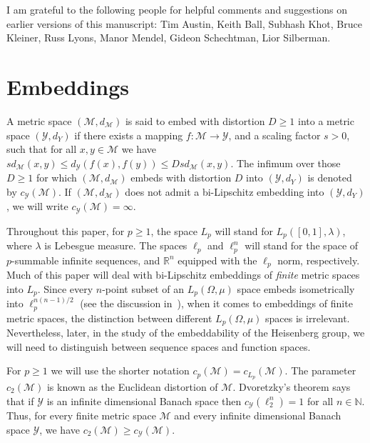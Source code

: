 \documentclass{icm2010}
\theoremstyle{definition}
\newcommand{\R}{\mathbb{R}}
\newcommand{\1}{\mathbf{1}}
\newcommand{\M}{\mathscr{M}}
\newcommand{\N}{\mathbb{N}}
\renewcommand{\le}{\leqslant}
\renewcommand{\ge}{\geqslant}
\newcommand{\Y}{\mathscr{Y}}
\begin{document}
\bigskip
{} I am grateful to the
following people for helpful comments and suggestions on earlier versions of this
manuscript: Tim Austin, Keith Ball, Subhash Khot, Bruce Kleiner, Russ Lyons,
Manor Mendel, Gideon Schechtman, Lior Silberman.








\section{Embeddings}\label{SEC:EMBED}

A metric space $(\M,d_\M)$ is said to embed with distortion $D\ge 1$
into a metric space $(\Y,d_Y)$ if there exists a mapping $f:\M\to
\Y$, and a scaling factor $s>0$, such that for all $x,y\in \M$ we
have $sd_\M(x,y)\le d_\Y(f(x),f(y))\le Dsd_\M(x,y)$. The infimum
over those $D\ge 1$ for which $(\M,d_\M)$ embeds with distortion $D$
into $(\Y,d_Y)$ is denoted by $c_\Y(\M)$. If $(\M,d_\M)$ does not
admit a bi-Lipschitz embedding into $(\Y,d_Y)$, we will write
$c_\Y(\M)=\infty$.




Throughout this paper, for $p\ge 1$, the space $L_p$ will stand for
$L_p([0,1],\lambda)$, where $\lambda$ is Lebesgue measure. The
spaces $\ell_p$ and $\ell_p^n$ will stand for the space of
$p$-summable infinite sequences, and $\R^n$ equipped with the
$\ell_p$ norm, respectively. Much of this paper will deal with
bi-Lipschitz embeddings of {\em finite} metric spaces into $L_p$.
Since every $n$-point subset of an $L_p(\Omega,\mu)$ space embeds
isometrically into $\ell_p^{n(n-1)/2}$ (see the discussion
in~\cite{Bal90}), when it comes to embeddings of finite metric
spaces, the distinction between different $L_p(\Omega,\mu)$ spaces
is irrelevant. Nevertheless, later, in the study of the
embeddability of the Heisenberg group, we will need to distinguish
between sequence spaces and function spaces.

For $p\ge 1$ we will use the shorter notation $c_p(\M)=
c_{L_p}(\M)$. The parameter $c_2(\M)$ is known as the Euclidean
distortion of $\M$. Dvoretzky's theorem says that if $\Y$ is an
infinite dimensional Banach space then $c_\Y(\ell_2^n)=1$ for all
$n\in \N$. Thus, for every finite metric space $\M$ and every
infinite dimensional Banach space $\Y$, we have $c_2(\M)\ge
c_\Y(\M)$.
\end{document}

